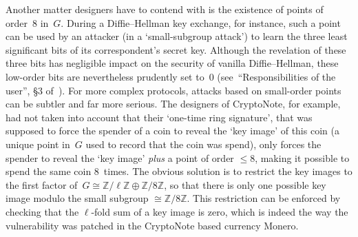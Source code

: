 \documentclass{amsproc}
\newcommand{\Z}{\mathbb{Z}}
\begin{document}
Another matter designers have to contend with
is the existence of points of order~$8$ in~$G$.
During a Diffie--Hellman key exchange, for instance,
such a point can be used by an attacker
(in a `small-subgroup attack')
to learn the three least significant
bits of its correspondent's secret key.
Although the revelation of these three bits has
negligible impact on the security of vanilla Diffie--Hellman,
these low-order bits are nevertheless prudently set to~$0$
(see~``Responsibilities of the user'', \S3 of~\cite{x25519}).
For more complex protocols,
attacks based on small-order points
can be subtler and far more serious.
The designers of CryptoNote\cite{cryptonote},
for example,
had not taken into account\cite{monero-disclosure,monero-curves-post}
that
their `one-time ring signature',
that was supposed to force the spender of a coin
to reveal the `key image' of this coin
(a unique point in~$G$ used to record that the coin was spend),
only forces the spender to reveal
the `key image' \emph{plus} a point of order $\leq 8$,
making it possible to spend the same coin 8~times.
The obvious solution is to restrict
the key images
to the first factor of~$G\cong \Z/\ell\Z \oplus \Z/8\Z$,
so that there is only one possible key image modulo
the small subgroup $\cong \Z/8\Z$.
This restriction can be enforced by checking that the $\ell$-fold
sum of a key image is zero,
which is indeed the way the vulnerability 
was patched in the CryptoNote based 
currency Monero.\cite{monero-fix}
\end{document}
